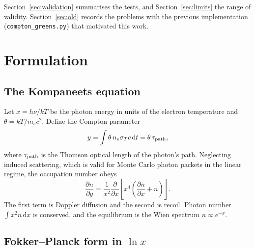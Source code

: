 \documentclass[11pt]{article}
\newcommand{\dd}{\mathrm{d}}
\begin{document}
Section~\ref{sec:validation} summarises the tests, and
Section~\ref{sec:limits} the range of validity. Section~\ref{sec:old} records
the problems with the previous implementation (\texttt{compton\_greens.py})
that motivated this work.

\section{Formulation}\label{sec:formulation}

\subsection{The Kompaneets equation}

Let $x=h\nu/kT$ be the photon energy in units of the electron temperature and
$\theta=kT/m_ec^2$. Define the Compton parameter
\begin{equation}
  y = \int \theta\, n_e\sigma_T c\,\dd t = \theta\,\tau_{\rm path},
\end{equation}
where $\tau_{\rm path}$ is the Thomson optical length of the photon's path.
Neglecting induced scattering, which is valid for Monte Carlo photon packets
in the linear regime, the occupation number obeys \citep{kompaneets1957}
\begin{equation}\label{eq:kompaneets}
  \frac{\partial n}{\partial y} = \frac{1}{x^2}\frac{\partial}{\partial x}
  \left[x^4\left(\frac{\partial n}{\partial x}+n\right)\right].
\end{equation}
The first term is Doppler diffusion and the second is recoil. Photon number
$\int x^2 n\,\dd x$ is conserved, and the equilibrium is the Wien spectrum
$n\propto e^{-x}$.

\subsection{Fokker--Planck form in $\ln x$}
\end{document}
